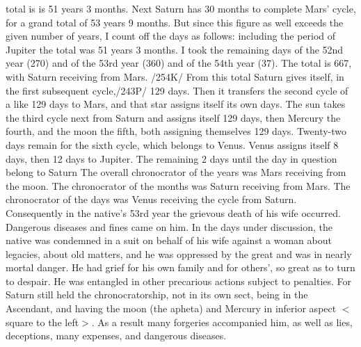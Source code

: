 total is is 51 years 3 months. Next Saturn has 30 months to complete Mars’ cycle, for a grand total of 53
years 9 months.
But since this figure as well exceeds the given number of years, I count off the days as follows:
including the period of Jupiter the total was 51 years 3 months. I took the remaining days of the 52nd year
(270) and of the 53rd year (360) and of the 54th year (37). The total is 667, with Saturn receiving from
Mars. /254K/ From this total Saturn gives itself, in the first subsequent cycle,/243P/ 129 days. Then it
transfers the second cycle of a like 129 days to Mars, and that star assigns itself its own days. The sun
takes the third cycle next from Saturn and assigns itself 129 days, then Mercury the fourth, and the moon
the fifth, both assigning themselves 129 days. Twenty-two days remain for the sixth cycle, which belongs
to Venus. Venus assigns itself 8 days, then 12 days to Jupiter. The remaining 2 days until the day in
question belong to Saturn The overall chronocrator of the years was Mars receiving from the moon. The chronocrator of the
months was Saturn receiving from Mars. The chronocrator of the days was Venus receiving the cycle from
Saturn. Consequently in the native’s 53rd year the grievous death of his wife occurred. Dangerous
diseases and fines came on him. In the days under discussion, the native was condemned in a suit on
behalf of his wife against a woman about legacies, about old matters, and he was oppressed by the great and
was in nearly mortal danger. He had grief for his own family and for others’, so great as to turn to despair.
He was entangled in other precarious actions subject to penalties. For Saturn still held the
chronocratorship, not in its own sect, being in the Ascendant, and having the moon (the apheta) and
Mercury in inferior aspect $<$square to the left$>$. As a result many forgeries accompanied him, as well as
lies, deceptions, many expenses, and dangerous diseases.


\newpage